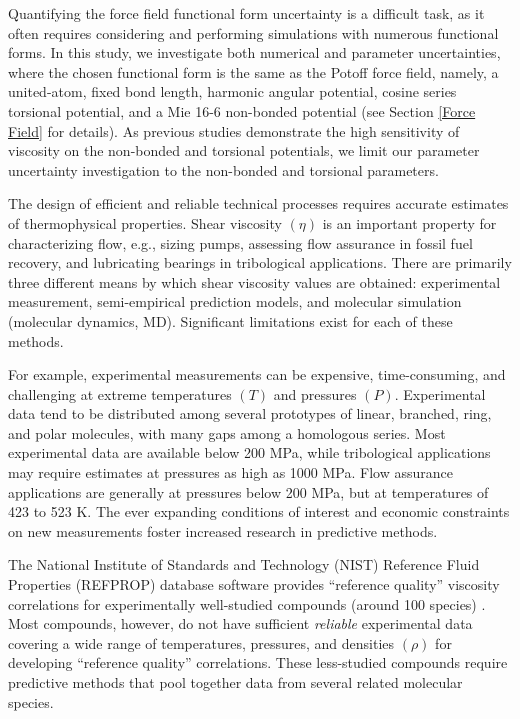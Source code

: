 \documentclass[preprint,review,12pt]{elsarticle}
\begin{document}
	Quantifying the force field functional form uncertainty is a difficult task, as it often requires considering and performing simulations with numerous functional forms. In this study, we investigate both numerical and parameter uncertainties, where the chosen functional form is the same as the Potoff force field, namely, a united-atom, fixed bond length, harmonic angular potential, cosine series torsional potential, and a Mie 16-6 non-bonded potential (see Section \ref{Force Field} for details). As previous studies demonstrate the high sensitivity of viscosity on the non-bonded and torsional potentials, we limit our parameter uncertainty investigation to the non-bonded and torsional parameters.  
	
	The design of efficient and reliable technical processes requires accurate estimates of thermophysical properties. Shear viscosity $(\eta)$ is an important property for characterizing flow, e.g., sizing pumps, assessing flow assurance in fossil fuel recovery, and lubricating bearings in tribological applications. There are primarily three different means by which shear viscosity values are obtained: experimental measurement, semi-empirical prediction models, and molecular simulation (molecular dynamics, MD). Significant limitations exist for each of these methods. 
	
	For example, experimental measurements can be expensive, time-consuming, and challenging at extreme temperatures $(T)$ and pressures $(P)$. Experimental data tend to be distributed among several prototypes of linear, branched, ring, and polar molecules, with many gaps among a homologous series. Most experimental data are available below 200 MPa, while tribological applications may require estimates at pressures as high as 1000 MPa. Flow assurance applications are generally at pressures below 200 MPa, but at temperatures of 423 to 523 K. The ever expanding conditions of interest and economic constraints on new measurements foster increased research in predictive methods.
	
    The National Institute of Standards and Technology (NIST) Reference Fluid Properties (REFPROP) database software provides ``reference quality'' viscosity correlations for experimentally well-studied compounds (around 100 species) \cite{LEMMON-RP10}. Most compounds, however, do not have sufficient \textit{reliable} experimental data covering a wide range of temperatures, pressures, and densities $(\rho)$ for developing ``reference quality'' correlations. These less-studied compounds require predictive methods that pool together data from several related molecular species. 
    
\end{document}
